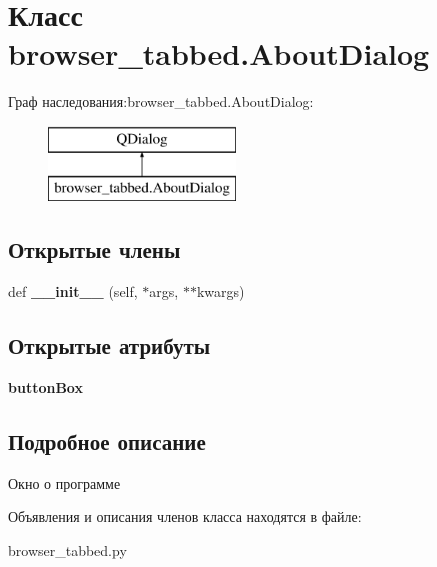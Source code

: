 \hypertarget{classbrowser__tabbed_1_1AboutDialog}{}\section{Класс browser\+\_\+tabbed.\+About\+Dialog}
\label{classbrowser__tabbed_1_1AboutDialog}
Граф наследования\+:browser\+\_\+tabbed.\+About\+Dialog\+:\begin{figure}[H]
\begin{center}
\leavevmode
\includegraphics[height=2.000000cm]{classbrowser__tabbed_1_1AboutDialog}
\end{center}
\end{figure}
\subsection*{Открытые члены}
\begin{DoxyCompactItemize}
\item 
\mbox{\label{classbrowser__tabbed_1_1AboutDialog_a236dc1ef2bdd047d218e77738b8e7477}} 
def {\bfseries \+\_\+\+\_\+init\+\_\+\+\_\+} (self, $\ast$args, $\ast$$\ast$kwargs)
\end{DoxyCompactItemize}
\subsection*{Открытые атрибуты}
\begin{DoxyCompactItemize}
\item 
\mbox{\label{classbrowser__tabbed_1_1AboutDialog_a7bacd037f5808b441831677a0c8ad958}} 
{\bfseries button\+Box}
\end{DoxyCompactItemize}


\subsection{Подробное описание}
\begin{DoxyVerb}Окно о программе\end{DoxyVerb}
 

Объявления и описания членов класса находятся в файле\+:\begin{DoxyCompactItemize}
\item 
browser\+\_\+tabbed.\+py\end{DoxyCompactItemize}
